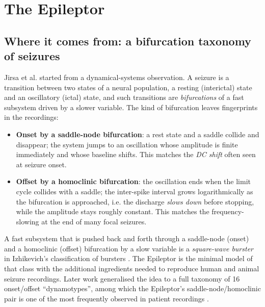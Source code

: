 \documentclass[11pt]{article}
\begin{document}
\section{The Epileptor}
\subsection{Where it comes from: a bifurcation taxonomy of seizures}
Jirsa et al. \cite{jirsa2014} started from a dynamical-systems observation. A seizure is a transition between
two states of a neural population, a resting (interictal) state and an oscillatory (ictal) state, and such
transitions are \emph{bifurcations} of a fast subsystem driven by a slower variable. The kind of bifurcation leaves
fingerprints in the recordings:
\begin{itemize}
\item \textbf{Onset by a saddle-node bifurcation}: a rest state and a saddle collide and disappear; the system jumps to
an oscillation whose amplitude is finite immediately and whose baseline shifts. This matches the \emph{DC shift}
often seen at seizure onset.
\item \textbf{Offset by a homoclinic bifurcation}: the oscillation ends when the limit cycle collides with a saddle;
the inter-spike interval grows logarithmically as the bifurcation is approached, i.e. the discharge
\emph{slows down} before stopping, while the amplitude stays roughly constant. This matches the
frequency-slowing at the end of many focal seizures.
\end{itemize}
A fast subsystem that is pushed back and forth through a saddle-node (onset) and a homoclinic (offset) bifurcation
by a slow variable is a \emph{square-wave burster} in Izhikevich's classification of bursters \cite{izhikevich2000}.
The Epileptor is the minimal model of that class with the additional ingredients needed to reproduce human and animal
seizure recordings. Later work generalised the idea to a full taxonomy of 16 onset/offset ``dynamotypes'', among which
the Epileptor's saddle-node/homoclinic pair is one of the most frequently observed in patient recordings \cite{saggio2020}.
\end{document}
